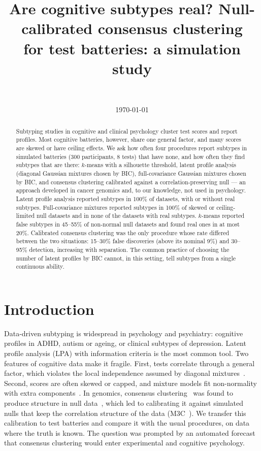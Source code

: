 \documentclass[11pt]{article}
\title{Are cognitive subtypes real? Null-calibrated consensus clustering\\ for test batteries: a simulation study}
\author{\authorname\\ \small \affiliation}
\date{\today}
\begin{document}
\maketitle

\begin{abstract}
Subtyping studies in cognitive and clinical psychology cluster test scores and report profiles. Most cognitive
batteries, however, share one general factor, and many scores are skewed or have ceiling effects. We ask how often
four procedures report subtypes in simulated batteries (300 participants, 8 tests) that have none, and how often they
find subtypes that are there: $k$-means with a silhouette threshold, latent profile analysis (diagonal Gaussian
mixtures chosen by BIC), full-covariance Gaussian mixtures chosen by BIC, and consensus clustering calibrated against a
correlation-preserving null --- an approach developed in cancer genomics and, to our knowledge, not used in psychology.
Latent profile analysis reported subtypes in 100\% of datasets, with or without real subtypes. Full-covariance
mixtures reported subtypes in 100\% of skewed or ceiling-limited null datasets and in none of the datasets with real
subtypes. $k$-means reported false subtypes in 45--55\% of non-normal null datasets and found real ones in at most
20\%. Calibrated consensus clustering was the only procedure whose rate differed between the two situations: 15--30\%
false discoveries (above its nominal 9\%) and 30--95\% detection, increasing with separation. The common practice of
choosing the number of latent profiles by BIC cannot, in this setting, tell subtypes from a single continuous ability.
\end{abstract}

\section{Introduction}
Data-driven subtyping is widespread in psychology and psychiatry: cognitive profiles in ADHD, autism or ageing, or
clinical subtypes of depression. Latent profile analysis (LPA) with information criteria is the most common tool.
Two features of cognitive data make it fragile. First, tests correlate through a general factor, which violates the
local independence assumed by diagonal mixtures~\cite{BauerCurran}. Second, scores are often skewed or capped, and
mixture models fit non-normality with extra components~\cite{BauerCurran}. In genomics, consensus
clustering~\cite{Monti} was found to produce structure in null data~\cite{Senbabaoglu}, which led to calibrating it
against simulated nulls that keep the correlation structure of the data (M3C~\cite{John}). We transfer this
calibration to test batteries and compare it with the usual procedures, on data where the truth is known. The question
was prompted by an automated forecast that consensus clustering would enter experimental and cognitive psychology.
\end{document}
